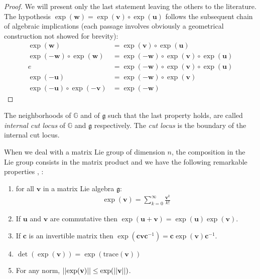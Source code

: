 \begin{proof}
	We will present only the last statement leaving the others to the literature. The hypothesis $\exp(\mathbf{w}) = \exp(\mathbf{v}) \circ \exp(\mathbf{u})$ follows the subsequent chain of algebraic implications (each passage involves obviously a geometrical construction not showed for brevity):
	\begin{align*}
		\exp(\mathbf{w}) &= \exp(\mathbf{v}) \circ \exp(\mathbf{u}) \\
		\exp(-\mathbf{w}) \circ \exp(\mathbf{w}) &= \exp(-\mathbf{w}) \circ\exp(\mathbf{v}) \circ \exp(\mathbf{u}) \\
		e &= \exp(-\mathbf{w}) \circ\exp(\mathbf{v}) \circ \exp(\mathbf{u}) \\
		\exp(-\mathbf{u})  &= \exp(-\mathbf{w}) \circ\exp(\mathbf{v})  \\
		\exp(-\mathbf{u}) \circ\exp(-\mathbf{v})  &= \exp(-\mathbf{w})  
	\end{align*}
\end{proof}
The neighborhoods of $\mathbb{G}$ and of $\mathfrak{g}$ such that the last property holds, are called \emph{internal cut locus} of $\mathbb{G}$ and $\mathfrak{g}$ respectively. The \emph{cut locus} is the boundary of the internal cut locus.

When we deal with a matrix Lie group of dimension $n$, the composition in the Lie group consists in the matrix product and we have the following remarkable properties \cite{hall2015lie}, \cite{kirillov2008introduction}:
\begin{enumerate}
	\item for all $\mathbf{v}$ in a matrix Lie algebra $\mathfrak{g}$:
	\begin{align}\label{eq:exp_as_inf_sum}
	\exp(\mathbf{v}) = \sum_{k=0}^{\infty} \frac{\mathbf{v}^{k}}{k!}
	\end{align}
	\item If $\mathbf{u}$ and $\mathbf{v}$ are commutative then $\exp(\mathbf{u} + \mathbf{v}) = \exp(\mathbf{u})\exp(\mathbf{v})$.
	\item If $\mathbf{c}$ is an invertible matrix then $\exp(\mathbf{c}\mathbf{v}\mathbf{c}^{-1}) = \mathbf{c}\exp(\mathbf{v})\mathbf{c}^{-1}$.
	\item $\det(\exp(\mathbf{v})) = \exp(\text{trace}(\mathbf{v}))$
	\item For any norm, $\vert\lvert \exp(\mathbf{v}) \rvert\vert \leq \exp(\vert\lvert \mathbf{v} \rvert\vert)$.
\end{enumerate}

